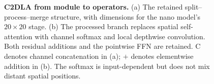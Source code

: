 \begin{figure}[t]
\centering
\resizebox{\textwidth}{!}{}
\caption{\textbf{C2DLA from module to operators.} (a) The retained split--process--merge
 structure, with dimensions for the nano model's $20\times20$ stage.
 (b) The processed branch replaces spatial self-attention with channel softmax and
 local depthwise convolution. Both residual additions and the pointwise FFN are retained.
 C denotes channel concatenation in (a); $+$ denotes elementwise addition in (b).
 The softmax is input-dependent but does not mix distant spatial positions.}
\label{fig:c2dla}
\end{figure}
